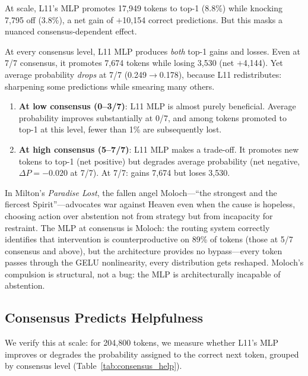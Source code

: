 \documentclass{article}
\begin{document}
At scale, L11's MLP promotes 17,949 tokens to top-1 (8.8\%) while knocking
7,795 off (3.8\%), a net gain of $+$10,154 correct predictions.
But this masks a nuanced consensus-dependent effect.

At every consensus level, L11 MLP produces \emph{both} top-1 gains and losses.
Even at 7/7 consensus, it promotes 7,674 tokens while losing 3,530 (net
$+$4,144).
Yet average probability \emph{drops} at 7/7 (0.249$\to$0.178), because L11
redistributes: sharpening some predictions while smearing many others.

\begin{enumerate}
\item \textbf{At low consensus (0--3/7)}: L11 MLP is almost purely beneficial.
Average probability improves substantially at 0/7, and among tokens promoted
to top-1 at this level, fewer than 1\% are subsequently lost.

\item \textbf{At high consensus (5--7/7)}: L11 MLP makes a trade-off.
It promotes new tokens to top-1 (net positive) but degrades average probability
(net negative, $\Delta P = -0.020$ at 7/7).
At 7/7: gains 7,674 but loses 3,530.
\end{enumerate}

In Milton's \emph{Paradise Lost}, the fallen angel Moloch---``the strongest
and the fiercest Spirit''---advocates war against Heaven even when the cause is
hopeless, choosing action over abstention not from strategy but from
incapacity for restraint.
The MLP at consensus is Moloch: the routing system correctly identifies that
intervention is counterproductive on 89\% of tokens (those at 5/7 consensus
and above), but the architecture provides no bypass---every token passes
through the GELU nonlinearity, every distribution gets reshaped.
Moloch's compulsion is structural, not a bug: the MLP is architecturally
incapable of abstention.

\subsection{Consensus Predicts Helpfulness}

We verify this at scale: for 204,800 tokens, we measure whether L11's MLP
improves or degrades the probability assigned to the correct next token,
grouped by consensus level (Table~\ref{tab:consensus_help}).
\end{document}
